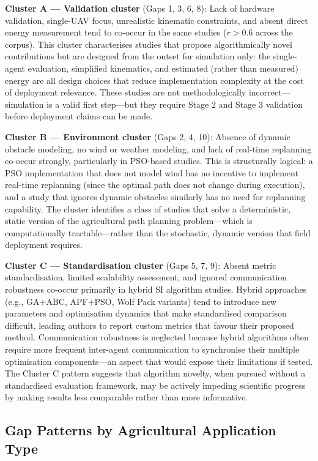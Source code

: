 \documentclass[review,3p,times]{elsarticle}
\begin{document}
\begin{itemize}
{\textbf{Cluster A --- Validation cluster} (Gaps 1, 3, 6, 8): Lack of hardware validation, single-UAV focus, unrealistic kinematic constraints, and absent direct energy measurement tend to co-occur in the same studies ($r > 0.6$ across the corpus). This cluster characterises studies that propose algorithmically novel contributions but are designed from the outset for simulation only: the single-agent evaluation, simplified kinematics, and estimated (rather than measured) energy are all design choices that reduce implementation complexity at the cost of deployment relevance. These studies are not methodologically incorrect---simulation is a valid first step---but they require Stage 2 and Stage 3 validation before deployment claims can be made.

\textbf{Cluster B --- Environment cluster} (Gaps 2, 4, 10): Absence of dynamic obstacle modeling, no wind or weather modeling, and lack of real-time replanning co-occur strongly, particularly in PSO-based studies. This is structurally logical: a PSO implementation that does not model wind has no incentive to implement real-time replanning (since the optimal path does not change during execution), and a study that ignores dynamic obstacles similarly has no need for replanning capability. The cluster identifies a class of studies that solve a deterministic, static version of the agricultural path planning problem---which is computationally tractable---rather than the stochastic, dynamic version that field deployment requires.

\textbf{Cluster C --- Standardisation cluster} (Gaps 5, 7, 9): Absent metric standardisation, limited scalability assessment, and ignored communication robustness co-occur primarily in hybrid SI algorithm studies. Hybrid approaches (e.g., GA+ABC, APF+PSO, Wolf Pack variants) tend to introduce new parameters and optimisation dynamics that make standardised comparison difficult, leading authors to report custom metrics that favour their proposed method. Communication robustness is neglected because hybrid algorithms often require more frequent inter-agent communication to synchronise their multiple optimisation components---an aspect that would expose their limitations if tested. The Cluster C pattern suggests that algorithm novelty, when pursued without a standardised evaluation framework, may be actively impeding scientific progress by making results less comparable rather than more informative.

\subsection{Gap Patterns by Agricultural Application Type}

}
\end{itemize}
\end{document}
